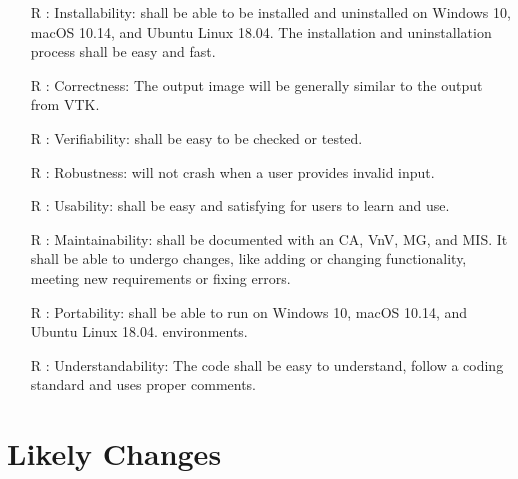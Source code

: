 \documentclass[12pt]{article}
\begin{document}
\begin{itemize}
\item[R\refstepcounter{reqnum}\thereqnum
\label{R_install}:]
Installability: \famname{} shall be able to be installed and uninstalled on Windows 10, macOS 10.14, and Ubuntu Linux 18.04. The installation and uninstallation process shall be easy and fast.
\item[R\refstepcounter{reqnum}\thereqnum
\label{R_correct}:]
Correctness: The output image will be generally similar to the output from VTK.
\item[R\refstepcounter{reqnum}\thereqnum
\label{R_verify}:]
Verifiability: \famname{} shall be easy to be checked or tested.
\item[R\refstepcounter{reqnum}\thereqnum
\label{R_robust}:]
Robustness: \famname{} will not crash when a user provides invalid input.
\item[R\refstepcounter{reqnum}\thereqnum
\label{R_use}:]
Usability: \famname{} shall be easy and satisfying for users to learn and use.
\item[R\refstepcounter{reqnum}\thereqnum
\label{R_maintain}:]
Maintainability: \famname{} shall be documented with an CA, VnV, MG, and MIS. It shall be able to undergo changes, like adding or changing functionality, meeting new requirements or fixing errors.
\item[R\refstepcounter{reqnum}\thereqnum
\label{R_portal}:]
Portability: \famname{} shall be able to run on Windows 10, macOS 10.14, and Ubuntu Linux 18.04.
environments.
\item[R\refstepcounter{reqnum}\thereqnum
\label{R_understand}:]
Understandability: The code shall be easy to understand, follow a coding standard and uses proper comments.
\end{itemize}

\section{Likely Changes}    
\end{document}
